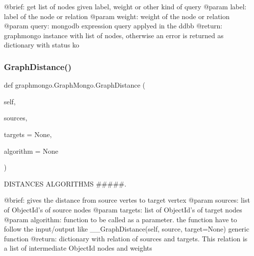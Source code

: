 \begin{DoxyVerb}    @brief: get list of nodes given label, weight or other kind of query
    @param label: label of the node or relation
    @param weight: weight of the node or relation
    @param query: mongodb expression query applyed in the ddbb
    @return: graphmongo instance with list of nodes, otherwise an error is returned as dictionary with status ko\end{DoxyVerb}
 \hypertarget{classgraphmongo_1_1GraphMongo_a05898a487478cb7409a2a510e5c716eb}{}\label{classgraphmongo_1_1GraphMongo_a05898a487478cb7409a2a510e5c716eb} 
\subsubsection{\texorpdfstring{Graph\+Distance()}{GraphDistance()}}
{\footnotesize\ttfamily def graphmongo.\+Graph\+Mongo.\+Graph\+Distance (\begin{DoxyParamCaption}\item[{}]{self,  }\item[{}]{sources,  }\item[{}]{targets = {\ttfamily None},  }\item[{}]{algorithm = {\ttfamily None} }\end{DoxyParamCaption})}



D\+I\+S\+T\+A\+N\+C\+ES A\+L\+G\+O\+R\+I\+T\+H\+MS \#\#\#\#\#. 

\begin{DoxyVerb}@brief: gives the distance from source vertes to target vertex
@param sources: list of ObjectId's of source nodes
@param targets: list of ObjectId's of target nodes      
@param algorithm: function to be called as a parameter. the function have to follow the input/output like __GraphDistance(self, source, target=None) generic function
@return: dictionary with relation of sources and targets. This relation is a list of intermediate ObjectId nodes and weights
\end{DoxyVerb}
 \hypertarget{classgraphmongo_1_1GraphMongo_a20e7f0726ec6951a51f9565702bd96e0}{}\label{classgraphmongo_1_1GraphMongo_a20e7f0726ec6951a51f9565702bd96e0} 
